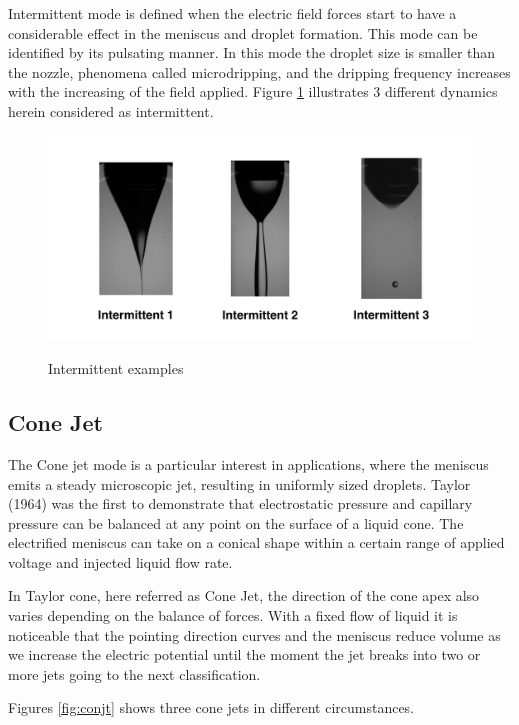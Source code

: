 Intermittent mode is defined when the electric field forces start to have a considerable effect in the meniscus and droplet formation. 
This mode can be identified by its pulsating manner.
In this mode the droplet size is smaller than the nozzle, phenomena called microdripping, and the dripping frequency increases with the increasing of the field applied.
Figure \ref{fig:intermittent_example} illustrates 3 different dynamics herein considered as intermittent.


  \begin{figure}[H]
      \center
      \includegraphics[width=15cm]{Figuras/19:03/intermittent_example.png}
      \label{fig:intermittent_example}
      \caption{Intermittent examples}
  \end{figure}


\subsection{Cone Jet}
\label{subsec:Cone Jet}

The Cone jet mode is a particular interest in applications, where the meniscus emits a steady microscopic jet, resulting in uniformly sized droplets. 
Taylor (1964)\cite{taylor} was the first to demonstrate that electrostatic pressure and capillary pressure can be balanced at any point on the surface of a liquid cone.
The electrified meniscus can take on a conical shape within a certain range of applied voltage and injected liquid flow rate. 

In Taylor cone, here referred as Cone Jet, the direction of the cone apex also varies depending on the balance of forces. 
With a fixed flow of liquid it is noticeable that the pointing direction curves and the meniscus reduce volume as we increase the electric potential until the moment the jet breaks into two or more jets going to the next classification. 

Figures \ref{fig:conjt} shows three cone jets in different circumstances.

